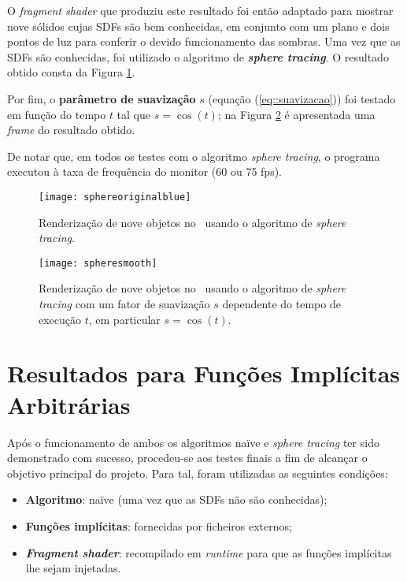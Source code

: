 O \textit{fragment shader} que produziu este resultado foi então adaptado para mostrar nove sólidos cujas \acfp{SDF} são bem conhecidas, em conjunto com um plano e dois pontos de luz para conferir o devido funcionamento das sombras. Uma vez que as \acsp{SDF} são conhecidas, foi utilizado o algoritmo de \textbf{\itshape sphere tracing}. O resultado obtido consta da Figura \ref{fig::sphereoriginalblue}.

Por fim, o \textbf{parâmetro de suavização} $s$ (equação (\ref{eq::suavizacao})) foi testado em função do tempo $t$ tal que $s = \cos(t)$; na Figura \ref{fig::spheresmooth} é apresentada uma \textit{frame} do resultado obtido.

De notar que, em todos os testes com o algoritmo \textit{sphere tracing}, o programa executou à taxa de frequência do monitor (60 ou 75 \acf{fps}).

\begin{figure}[!htbp]
	\centering
	\texttt{[image: sphereoriginalblue]}
	\caption[Nove objetos com \textit{sphere tracing} no \theapp]{Renderização de nove objetos no \theapp~usando o algoritmo de \textit{sphere tracing}.}
	\label{fig::sphereoriginalblue}
\end{figure}

\begin{figure}[!htbp]
	\centering
	\texttt{[image: spheresmooth]}
	\caption[Nove objetos com \textit{sphere tracing} e suavização no \theapp]{Renderização de nove objetos no \theapp~usando o algoritmo de \textit{sphere tracing} com um fator de suavização $s$ dependente do tempo de execução $t$, em particular $s = \cos(t)$.}
	\label{fig::spheresmooth}
\end{figure}


\section{Resultados para Funções Implícitas Arbitrárias}
\label{sec::testes:resultados}

Após o funcionamento de ambos os algoritmos naïve e \textit{sphere tracing} ter sido demonstrado com sucesso, procedeu-se aos testes finais a fim de alcançar o objetivo principal do projeto. Para tal, foram utilizadas as seguintes condições:

\begin{itemize}
	\item \textbf{Algoritmo}: naïve (uma vez que as \acsp{SDF} não são conhecidas);
	\item \textbf{Funções implícitas}: fornecidas por ficheiros externos;
	\item \textbf{\itshape Fragment shader}: recompilado em \textit{runtime} para que as funções implícitas lhe sejam injetadas.
\end{itemize}


